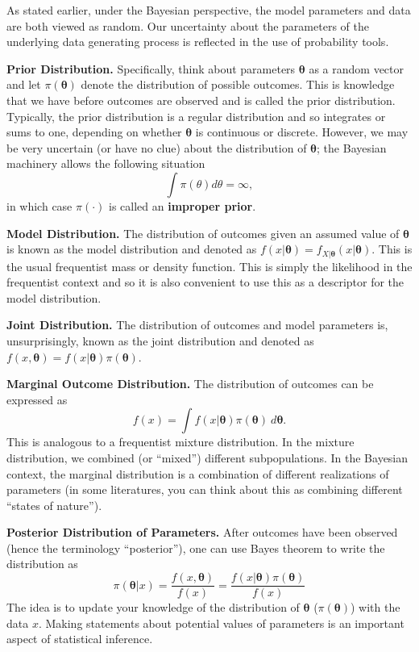 \documentclass[]{book}
\theoremstyle{definition}
\theoremstyle{definition}
\theoremstyle{definition}
\theoremstyle{remark}
\begin{document}
As stated earlier, under the Bayesian perspective, the model parameters
and data are both viewed as random. Our uncertainty about the parameters
of the underlying data generating process is reflected in the use of
probability tools.

\textbf{Prior Distribution.} Specifically, think about parameters
\(\boldsymbol \theta\) as a random vector and let
\(\pi(\boldsymbol \theta)\) denote the distribution of possible
outcomes. This is knowledge that we have before outcomes are observed
and is called the prior distribution. Typically, the prior distribution
is a regular distribution and so integrates or sums to one, depending on
whether \(\boldsymbol \theta\) is continuous or discrete. However, we
may be very uncertain (or have no clue) about the distribution of
\(\boldsymbol \theta\); the Bayesian machinery allows the following
situation \[\int \pi(\theta) d\theta = \infty,\] in which case
\(\pi(\cdot)\) is called an \textbf{improper prior}.

\textbf{Model Distribution.} The distribution of outcomes given an
assumed value of \(\boldsymbol \theta\) is known as the model
distribution and denoted as
\(f(x | \boldsymbol \theta) = f_{X|\boldsymbol \theta} (x|\boldsymbol \theta )\).
This is the usual frequentist mass or density function. This is simply
the likelihood in the frequentist context and so it is also convenient
to use this as a descriptor for the model distribution.

\textbf{Joint Distribution.} The distribution of outcomes and model
parameters is, unsurprisingly, known as the joint distribution and
denoted as
\(f(x , \boldsymbol \theta) = f(x|\boldsymbol \theta )\pi(\boldsymbol \theta)\).

\textbf{Marginal Outcome Distribution.} The distribution of outcomes can
be expressed as
\[f(x) = \int f(x | \boldsymbol \theta)\pi(\boldsymbol \theta) ~d \boldsymbol \theta.\]
This is analogous to a frequentist mixture distribution. In the mixture
distribution, we combined (or ``mixed'') different subpopulations. In
the Bayesian context, the marginal distribution is a combination of
different realizations of parameters (in some literatures, you can think
about this as combining different ``states of nature'').

\textbf{Posterior Distribution of Parameters.} After outcomes have been
observed (hence the terminology ``posterior''), one can use Bayes
theorem to write the distribution as
\[\pi(\boldsymbol \theta | x) =\frac{f(x , \boldsymbol \theta)}{f(x)} =\frac{f(x|\boldsymbol \theta )\pi(\boldsymbol \theta)}{f(x)}\]
The idea is to update your knowledge of the distribution of
\(\boldsymbol \theta\) (\(\pi(\boldsymbol \theta)\)) with the data
\(x\). Making statements about potential values of parameters is an
important aspect of statistical inference.
\end{document}
